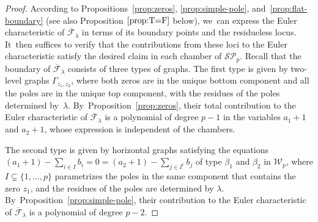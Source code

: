 \begin{proof}
According to Propositions~\ref{prop:zeros}, \ref{prop:simple-pole}, and~\ref{prop:flat-boundary} (see also Proposition $\ref{prop:T=F}$ below), we~can express the Euler characteristic of $\overline{\mathcal F}_\lambda$ in terms of its boundary points and the residueless locus. It~then suffices to verify that the contributions from these loci to the Euler characteristic satisfy the desired claim in each chamber of $\mathcal{SP}_p$.
Recall that the boundary of $\overline{\mathcal{F}}_\lambda$ consists of three types of graphs. The first type is given by two-level graphs $\Gamma_{z_1,z_2}$, where both zeros are in the unique bottom component and all the poles are in the unique top component, with the residues of the poles determined by~$\lambda$. By~Proposition~\ref{prop:zeros}, their total contribution to the Euler characteristic of $\overline{\mathcal F}_\lambda$ is a polynomial of degree $p-1$ in the variables $a_1+1$ and $a_2+1$, whose expression is independent of the chambers.

The second type is given by horizontal graphs satisfying the equations $(a_1+1)-\sum_{i\in I}b_i=0=(a_2+1)-\sum_{j\in I^c}b_j$ of type $\beta_1$ and $\beta_2$
in $\mathcal{W}_p$, where $I\subsetneq \{1,\ldots,p\}$ parametrizes the poles in the same component that contains the zero $z_1$, and the residues of the poles are determined by $\lambda$. By~Proposition~\ref{prop:simple-pole}, their contribution to the Euler characteristic of $\overline{\mathcal F}_\lambda$ is a polynomial of degree $p-2$.


\end{proof}
